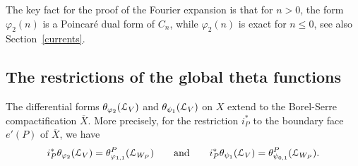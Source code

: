 The key fact for the proof of the Fourier expansion is that for $n>0$, the form $\varphi_2(n)$ is a Poincar\'e dual form of $C_n$, while $\varphi_2(n)$ is exact for $n \leq 0$, see also Section~\ref{currents}. 








\subsection{The restrictions of the global theta functions}


\begin{theorem}\label{restriction}

The differential forms $\theta_{\varphi_2}(\mathcal{L}_V)$ and $\theta_{\psi_1}(\mathcal{L}_V)$ on $X$ extend to the Borel-Serre compactification $\overline{X}$. More precisely, for the restriction $i_P^{\ast}$ to the boundary face $e'(P)$ of $\overline{X}$, we have
\[
i_P^{\ast} \theta_{\varphi_2}(\mathcal{L}_V) = \theta^P_{\varphi_{1,1}}(\mathcal{L}_{W_P}) \qquad \text{and} \qquad i_P^{\ast} \theta_{\psi_1}(\mathcal{L}_V) =  \theta^P_{\psi_{0,1}}(\mathcal{L}_{W_P}). 
\]
\end{theorem}

